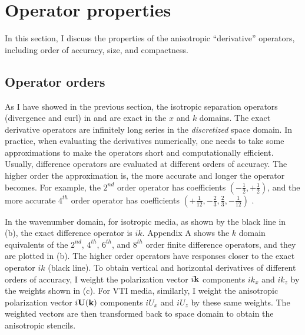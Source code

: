 \section{Operator properties}
In this section, I discuss the properties of the anisotropic ``derivative''
operators, including order of accuracy, size, and compactness.

\subsection{Operator orders}
As I have showed in the previous section, the isotropic separation
operators (divergence and curl) in  and  are
exact in the $x$ and $k$ domains. 
{The exact derivative operators are infinitely long
series in the \emph{discretized} space domain.} In practice, when
evaluating the derivatives numerically, one needs to take some
approximations to make the operators short and computationally
efficient. Usually, difference operators are evaluated at different
orders of accuracy. The higher order the approximation is, the more
accurate and longer the operator becomes. For example, the $2^{nd}$
order operator has coefficients $(-\frac{1}{2},+\frac{1}{2})$, and the
more accurate $4^{th}$ order operator has coefficients
$(+\frac{1}{12},-\frac{2}{3},\frac{2}{3},-\frac{1}{12})$ \cite[]{Fornberg:1999}.

In the wavenumber domain, for isotropic media, as shown by the black
line in (b), the exact difference operator is $ik$.
Appendix A shows the $k$ domain equivalents of the $2^{nd}$, $4^{th}$,
$6^{th}$, and $8^{th}$ order finite difference operators, and they are
plotted in (b). The higher order operators have
responses closer to the exact operator $ik$ (black line). To obtain
vertical and horizontal derivatives of different orders of accuracy,
I weight the polarization vector $i\mathbf k$ components $ik_x$ and $ik_z$
by the weights shown in (c). For VTI media, similarly,
I weight the anisotropic polarization vector $i\mathbf U(\mathbf k)$ components
$iU_x$ and $iU_z$ by these same weights. The weighted vectors are then
transformed back to space domain to obtain the anisotropic stencils.






